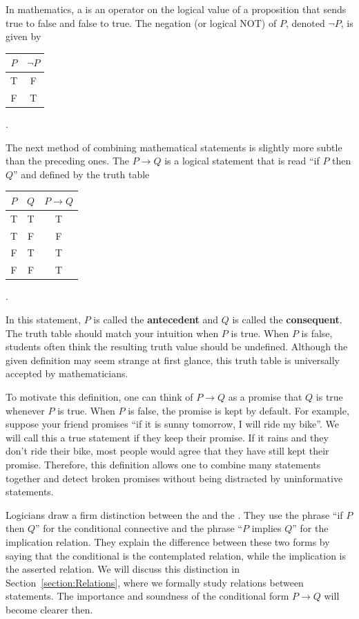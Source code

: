 In mathematics, a  is an operator on the logical value of a proposition that sends true to false and false to true.
The negation (or logical NOT) of $P$, denoted $\neg P$, is given by
\begin{center}
\begin{tabular}{|c|c|}
\hline
$P$ & $\neg P$ \tabularnewline
\hline
T & F \tabularnewline
F & T \tabularnewline
\hline
\end{tabular} .
\end{center}



The next method of combining mathematical statements is slightly more subtle than the preceding ones.
The  $P \rightarrow Q$ is a logical statement that is read ``if $P$ then $Q$'' and defined by the truth table

\begin{center}
\begin{tabular}{|c|c|c|}
\hline
$P$ & $Q$ & $P \rightarrow Q$ \tabularnewline
\hline
T & T & T \tabularnewline
T & F & F \tabularnewline
F & T & T \tabularnewline
F & F & T \tabularnewline
\hline
\end{tabular} .
\end{center}
In this statement, $P$ is called the \textbf{antecedent} and $Q$ is called the \textbf{consequent}.
The truth table should match your intuition when $P$ is true.
When $P$ is false, students often think the resulting truth value should be undefined.
Although the given definition may seem strange at first glance, this truth table is universally accepted by mathematicians.

To motivate this definition, one can think of $P \rightarrow Q$ as a promise that $Q$ is true whenever $P$ is true.
When $P$ is false, the promise is kept by default.
For example, suppose your friend promises ``if it is sunny tomorrow, I will ride my bike''.
We will call this a true statement if they keep their promise.
If it rains and they don't ride their bike, most people would agree that they have still kept their promise.
Therefore, this definition allows one to combine many statements together and detect broken promises without being distracted by uninformative statements.

Logicians draw a firm distinction between the  and the .
They use the phrase ``if $P$ then $Q$'' for the conditional connective and the phrase ``$P$ implies $Q$'' for the implication relation.
They explain the difference between these two forms by saying that the conditional is the contemplated relation, while the implication is the asserted relation.
We will discuss this distinction in Section~\ref{section:Relations}, where we formally study relations between statements.
The importance and soundness of the conditional form $P \rightarrow Q$ will become clearer then.

